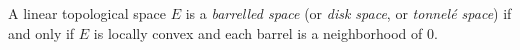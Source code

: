 A linear topological space $E$ is a \textit{barrelled space} (or \textit{disk space}, or \textit{tonnel\'{e} space}) if and only if $E$ is locally convex and each barrel is a neighborhood of $0$.
